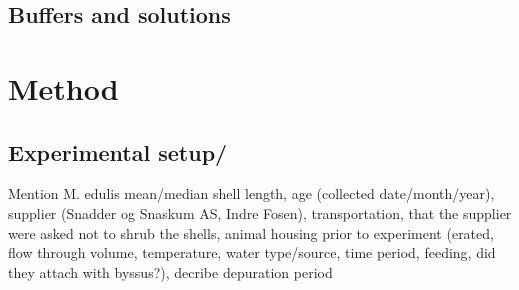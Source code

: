 \subsection{Buffers and solutions}
\begin{table}[H]
	\centering
	\label{tb:buffers}
\end{table}

\section{Method}
\subsection{Experimental setup/}
Mention M. edulis mean/median shell length, age (collected date/month/year), supplier (Snadder og Snaskum AS, Indre Fosen), transportation, that the supplier were asked not to shrub the shells, animal housing prior to experiment (erated, flow through volume, temperature, water type/source, time period, feeding, did they attach with byssus?), decribe depuration period

